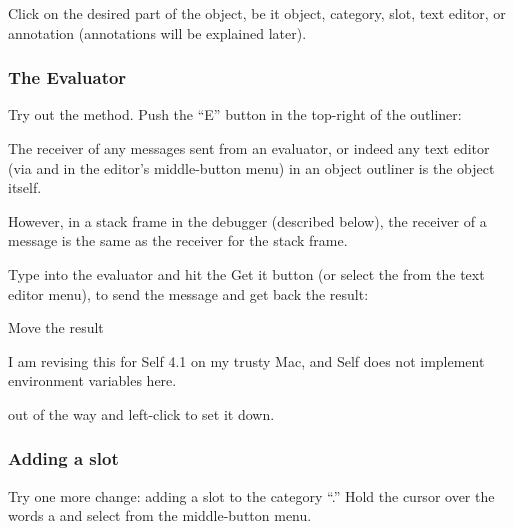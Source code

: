 \documentclass[letterpaper,10pt,english]{sphinxmanual}
\begin{document}
Click on the desired part of the object, be it object, category, slot, text editor, or annotation (annotations
will be explained later).
\newpage

\subsubsection{The Evaluator}
\label{\detokenize{howtoprg:the-evaluator}}
Try out the  method. Push the “E” button in the top-right of the outliner:
\begin{figure}[htbp]
\centering

\noindent{}
\end{figure}

The receiver of any messages sent from an evaluator, or indeed any text editor (via  and 
in the editor’s middle-button menu) in an object outliner is the object itself. %
\begin{footnote}[2]\sphinxAtStartFootnote
However, in a stack frame in the debugger (described below), the receiver of a message is the same as the receiver for the stack frame.
%
\end{footnote} Type  into
the evaluator and hit the Get it button (or select the  from the text editor menu), to send
the message and get back the result:
\begin{figure}[htbp]
\centering

\noindent{}
\end{figure}

Move the result %
\begin{footnote}[3]\sphinxAtStartFootnote
I am revising this for Self 4.1 on my trusty Mac, and Self does not implement environment variables here.
%
\end{footnote} out of the way and left-click to set it down.
\newpage

\subsubsection{Adding a slot}
\label{\detokenize{howtoprg:adding-a-slot}}
Try one more change: adding a slot to the category “.” Hold the cursor
over the words a  and select  from the middle-button menu.
\begin{figure}[htbp]
\centering

\noindent{}
\end{figure}
\end{document}
